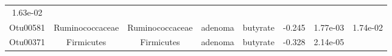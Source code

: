\documentclass[11pt,]{article}
\begin{document}
\begin{longtable}[]{@{}cccccccc@{}}
\begin{minipage}[t]{0.08\columnwidth}
1.63e-02\strut
\end{minipage}\tabularnewline
\begin{minipage}[t]{0.08\columnwidth}\centering\strut
Otu00581\strut
\end{minipage} & \begin{minipage}[t]{0.15\columnwidth}\centering\strut
Ruminococcaceae\strut
\end{minipage} & \begin{minipage}[t]{0.15\columnwidth}\centering\strut
Ruminococcaceae\strut
\end{minipage} & \begin{minipage}[t]{0.08\columnwidth}\centering\strut
adenoma\strut
\end{minipage} & \begin{minipage}[t]{0.09\columnwidth}\centering\strut
butyrate\strut
\end{minipage} & \begin{minipage}[t]{0.07\columnwidth}\centering\strut
-0.245\strut
\end{minipage} & \begin{minipage}[t]{0.08\columnwidth}\centering\strut
1.77e-03\strut
\end{minipage} & \begin{minipage}[t]{0.08\columnwidth}\centering\strut
1.74e-02\strut
\end{minipage}\tabularnewline
\begin{minipage}[t]{0.08\columnwidth}\centering\strut
Otu00371\strut
\end{minipage} & \begin{minipage}[t]{0.15\columnwidth}\centering\strut
Firmicutes\strut
\end{minipage} & \begin{minipage}[t]{0.15\columnwidth}\centering\strut
Firmicutes\strut
\end{minipage} & \begin{minipage}[t]{0.08\columnwidth}\centering\strut
adenoma\strut
\end{minipage} & \begin{minipage}[t]{0.09\columnwidth}\centering\strut
butyrate\strut
\end{minipage} & \begin{minipage}[t]{0.07\columnwidth}\centering\strut
-0.328\strut
\end{minipage} & \begin{minipage}[t]{0.08\columnwidth}\centering\strut
2.14e-05\strut
\end{minipage} & \begin{minipage}[t]{0.08\columnwidth}\centering\strut

\end{minipage}
\end{longtable}
\end{document}
